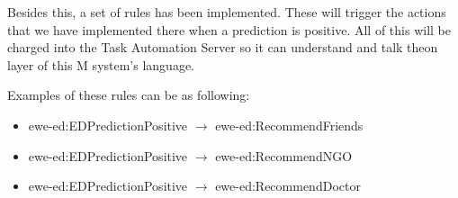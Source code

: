 Besides this, a set of rules has been implemented. These will trigger the actions that we have implemented there when a prediction is positive. All of this will be charged into the Task Automation Server so it can understand and talk theon layer of this M system's language.

Examples of these rules can be as following:
\begin{itemize}
    \item ewe-ed:EDPredictionPositive $\rightarrow$ ewe-ed:RecommendFriends
    \item ewe-ed:EDPredictionPositive $\rightarrow$ ewe-ed:RecommendNGO
    \item ewe-ed:EDPredictionPositive $\rightarrow$ ewe-ed:RecommendDoctor
    
\end{itemize}

